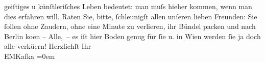 \begin{ledgroupsized}[t]{13cm}
               geiſtiges u künſtleriſches Leben bedeutet: man muſs hieher kommen, wenn man dies
               erfahren will.\pend
           \pstart
           Raten Sie, bitte, ſchleunigſt allen unſeren lieben Freunden: Sie ſollen ohne Zaudern,
               ohne eine Minute zu verlieren, ihr Bündel packen und nach Berlin ko{\geminationm}en – Alle, – es iſt hier
               Boden genug für ſie u. in Wien werden ſie \introOben{}ja\introOben{} doch alle verkü{\geminationm}ern! \pend
           \pstart
           Herzlichſt Ihr{\\[\baselineskip]}\spacefill\mbox{EMKafka}\pend
           \leftskip=0em{}\pstart
           \noindent{}\label{T_L00158-1v}\label{T_L00158-1h}\pend
           
         
         \endnumbering{}\end{ledgroupsized}  \newcommand{\dateiname}{L00158}\newcommand{\titel}{Eduard Michael Kafka an Arthur Schnitzler, 12. 1. 1893}\newcommand{\editorInnen}{Martin Anton Müller und Gerd-Hermann Susen}
      